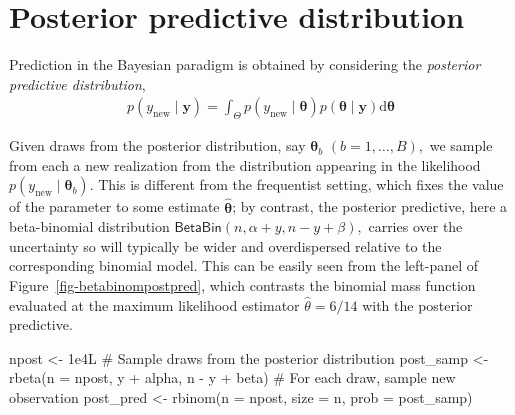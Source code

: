 \documentclass[
  11pt,
  letterpaper,
]{scrbook}
\newenvironment{Shaded}{\begin{snugshade}}{\end{snugshade}}
\newcommand{\AttributeTok}[1]{\textcolor[rgb]{0.40,0.45,0.13}{#1}}
\newcommand{\CommentTok}[1]{\textcolor[rgb]{0.37,0.37,0.37}{#1}}
\newcommand{\FloatTok}[1]{\textcolor[rgb]{0.68,0.00,0.00}{#1}}
\newcommand{\FunctionTok}[1]{\textcolor[rgb]{0.28,0.35,0.67}{#1}}
\newcommand{\NormalTok}[1]{\textcolor[rgb]{0.00,0.23,0.31}{#1}}
\newcommand{\OtherTok}[1]{\textcolor[rgb]{0.00,0.23,0.31}{#1}}
\newcommand{\SpecialCharTok}[1]{\textcolor[rgb]{0.37,0.37,0.37}{#1}}
\theoremstyle{definition}
\theoremstyle{definition}
\theoremstyle{definition}
\theoremstyle{plain}
\theoremstyle{plain}
\theoremstyle{plain}
\theoremstyle{remark}
\begin{document}
\section{Posterior predictive
distribution}\label{posterior-predictive-distribution}

Prediction in the Bayesian paradigm is obtained by considering the
\emph{posterior predictive distribution}, \begin{align*}
p(y_{\text{new}} \mid \boldsymbol{y}) =
\int_{\Theta} p(y_{\text{new}}  \mid \boldsymbol{\theta}) p(\boldsymbol{\theta} \mid  \boldsymbol{y}) \mathrm{d} \boldsymbol{\theta}
\end{align*}

Given draws from the posterior distribution, say
\(\boldsymbol{\theta}_b\) \((b=1, \ldots, B),\) we sample from each a
new realization from the distribution appearing in the likelihood
\(p(y_{\text{new}}  \mid \boldsymbol{\theta}_b).\) This is different
from the frequentist setting, which fixes the value of the parameter to
some estimate \(\widehat{\boldsymbol{\theta}}\); by contrast, the
posterior predictive, here a beta-binomial distribution
\(\mathsf{BetaBin}(n, \alpha + y, n - y + \beta),\) carries over the
uncertainty so will typically be wider and overdispersed relative to the
corresponding binomial model. This can be easily seen from the
left-panel of Figure~\ref{fig-betabinompostpred}, which contrasts the
binomial mass function evaluated at the maximum likelihood estimator
\(\widehat{\theta}=6/14\) with the posterior predictive.

\begin{Shaded}
\begin{Highlighting}[]
\NormalTok{npost }\OtherTok{\textless{}{-}} \FloatTok{1e4}\NormalTok{L}
\CommentTok{\# Sample draws from the posterior distribution}
\NormalTok{post\_samp }\OtherTok{\textless{}{-}} \FunctionTok{rbeta}\NormalTok{(}\AttributeTok{n =}\NormalTok{ npost, y }\SpecialCharTok{+}\NormalTok{ alpha, n }\SpecialCharTok{{-}}\NormalTok{ y }\SpecialCharTok{+}\NormalTok{ beta)}
\CommentTok{\# For each draw, sample new observation}
\NormalTok{post\_pred }\OtherTok{\textless{}{-}} \FunctionTok{rbinom}\NormalTok{(}\AttributeTok{n =}\NormalTok{ npost, }\AttributeTok{size =}\NormalTok{ n, }\AttributeTok{prob =}\NormalTok{ post\_samp)}
\end{Highlighting}
\end{Shaded}
\end{document}
